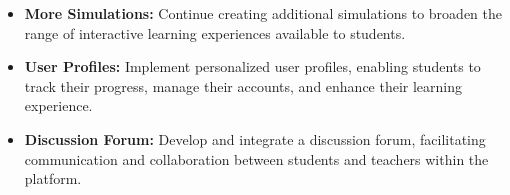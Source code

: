\begin{itemize}[leftmargin=1cm]
    \item \textbf{More Simulations:} Continue creating additional simulations to broaden the range of interactive learning experiences available to students.
    
    \item \textbf{User Profiles:} Implement personalized user profiles, enabling students to track their progress, manage their accounts, and enhance their learning experience.
    
    \item \textbf{Discussion Forum:} Develop and integrate a discussion forum, facilitating communication and collaboration between students and teachers within the platform.
\end{itemize}